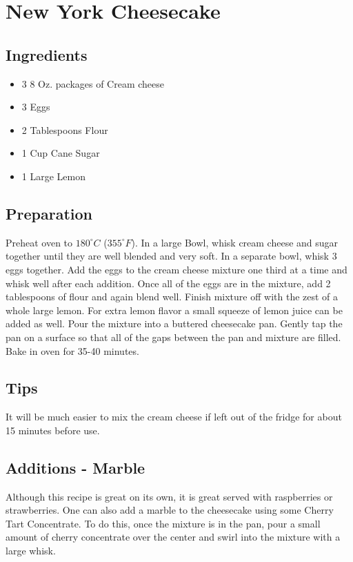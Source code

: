 \thispagestyle{fancy}
\section{New York Cheesecake}
\AddToShipoutPicture*{\Cheesecake}

\subsection*{Ingredients}
\begin{multicols}{2}
	\begin{itemize}
		\item 3 8 Oz. packages of Cream cheese
		\item 3 Eggs
		\item 2 Tablespoons Flour
		\item 1 Cup Cane Sugar
		\item 1 Large Lemon
	\end{itemize}
\end{multicols}

\subsection*{Preparation}
Preheat oven to $180^\circ C$ ($355^\circ F$). In a large Bowl, whisk cream cheese and sugar together until they are well blended and very soft. In a separate bowl, whisk 3 eggs together. Add the eggs to the cream cheese mixture one third at a time and whisk well after each addition. Once all of the eggs are in the mixture, add 2 tablespoons of flour and again blend well. Finish mixture off with the zest of a whole large lemon. For extra lemon flavor a small squeeze of lemon juice can be added as well. Pour the mixture into a buttered cheesecake pan. Gently tap the pan on a surface so that all of the gaps between the pan and mixture are filled. Bake in oven for 35-40 minutes.

\subsection*{Tips}
It will be much easier to mix the cream cheese if left out of the fridge for about 15 minutes before use.

\subsection*{Additions - Marble}
Although this recipe is great on its own, it is great served with raspberries or strawberries. One can also add a marble to the cheesecake using some Cherry Tart Concentrate. To do this, once the mixture is in the pan, pour a small amount of cherry concentrate over the center and swirl into the mixture with a large whisk.

